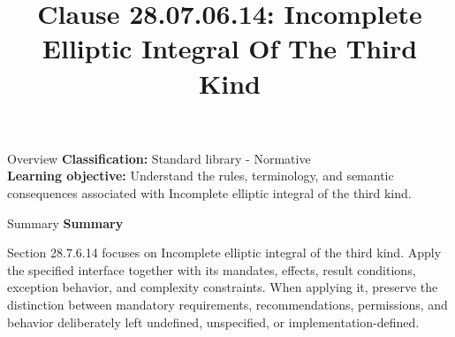 \documentclass[10pt,letterpaper]{article}
\title{Clause 28.07.06.14: Incomplete Elliptic Integral Of The Third Kind}
\author{}
\date{}
\begin{document}
\maketitle
\begin{CornellOverviewBox}{Overview}
\textbf{Classification:} Standard library - Normative\\[2pt]
\textbf{Learning objective:} Understand the rules, terminology, and semantic consequences associated with Incomplete elliptic integral of the third kind.
\end{CornellOverviewBox}\begin{CornellSummaryBox}{Summary}
{\sffamily\bfseries\color{Accent} Summary}\par\vspace{3pt}Section 28.7.6.14 focuses on Incomplete elliptic integral of the third kind. Apply the specified interface together with its mandates, effects, result conditions, exception behavior, and complexity constraints. When applying it, preserve the distinction between mandatory requirements, recommendations, permissions, and behavior deliberately left undefined, unspecified, or implementation-defined.
\end{CornellSummaryBox}
\end{document}
